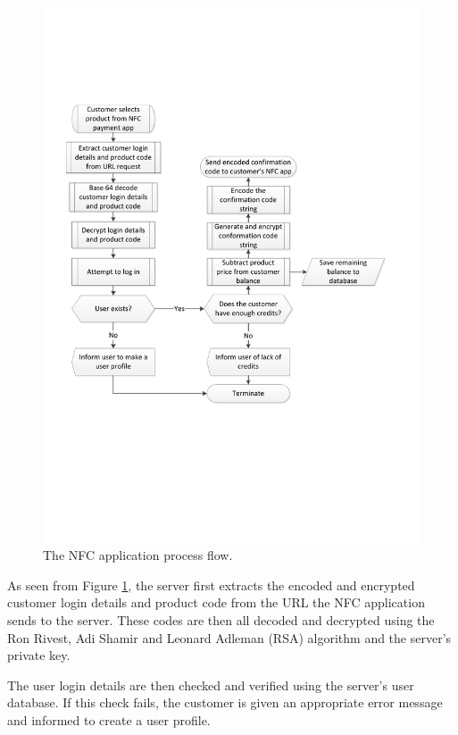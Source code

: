 \begin{figure}
 \centering 
 \includegraphics[clip=true, trim = 0 220 50 120,
 scale=0.7]{nfc_processflow_bak}
 \caption{The NFC application process flow.}
 \label{fig:nfc-process}
\end{figure}

As seen from Figure \ref{fig:nfc-process}, the server first extracts the encoded and encrypted
customer login details and product code from the URL the NFC application sends to the server. These
codes are then all decoded and decrypted using the Ron Rivest, Adi Shamir and Leonard Adleman
(RSA) algorithm and the server's private key. 

The user login details are then checked and verified using the server's user database. If this
check fails, the customer is given an appropriate error message and informed to create a user
profile. 

